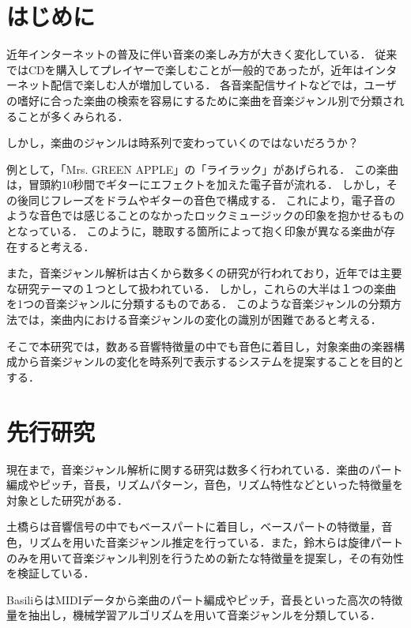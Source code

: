 

\section{はじめに}

近年インターネットの普及に伴い音楽の楽しみ方が大きく変化している．
従来ではCDを購入してプレイヤーで楽しむことが一般的であったが，近年はインターネット配信で楽しむ人が増加している．
各音楽配信サイトなどでは，ユーザの嗜好に合った楽曲の検索を容易にするために楽曲を音楽ジャンル別で分類されることが多くみられる．

しかし，楽曲のジャンルは時系列で変わっていくのではないだろうか？

例として，「Mrs. GREEN APPLE」の「ライラック」\cite{lilac}があげられる．
この楽曲は，冒頭約10秒間でギターにエフェクトを加えた電子音が流れる．
しかし，その後同じフレーズをドラムやギターの音色で構成する．
これにより，電子音のような音色では感じることのなかったロックミュージックの印象を抱かせるものとなっている．
このように，聴取する箇所によって抱く印象が異なる楽曲が存在すると考える．

また，音楽ジャンル解析は古くから数多くの研究が行われており，近年では主要な研究テーマの１つとして扱われている．
しかし，これらの大半は１つの楽曲を1つの音楽ジャンルに分類するものである．
このような音楽ジャンルの分類方法では，楽曲内における音楽ジャンルの変化の識別が困難であると考える．

そこで本研究では，数ある音響特徴量の中でも音色に着目し，対象楽曲の楽器構成から音楽ジャンルの変化を時系列で表示するシステムを提案することを目的とする．




\section{先行研究}
現在まで，音楽ジャンル解析に関する研究は数多く行われている．楽曲のパート編成やピッチ，音長，リズムパターン，音色，リズム特性などといった特徴量を対象とした研究がある．

土橋らは音響信号の中でもベースパートに着目し，ベースパートの特徴量，音色，リズムを用いた音楽ジャンル推定を行っている\cite{bassline}．また，鈴木らは旋律パートのみを用いて音楽ジャンル判別を行うための新たな特徴量を提案し，その有効性を検証している\cite{melody}．

Basiliら\cite{basili}はMIDIデータから楽曲のパート編成やピッチ，音長といった高次の特徴量を抽出し，機械学習アルゴリズムを用いて音楽ジャンルを分類している．

